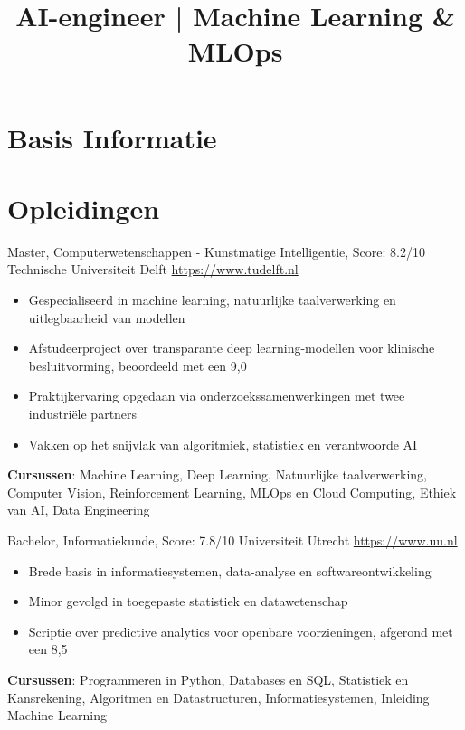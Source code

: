 \documentclass[a4paper, serif, 10pt]{moderncv}
\title{AI-engineer | Machine Learning \& MLOps}
\begin{document}
\maketitle

\section{Basis Informatie}

\section{Opleidingen}

        {Master, Computerwetenschappen - Kunstmatige Intelligentie, Score: 8.2/10}
        {Technische Universiteit Delft}
        {\url{https://www.tudelft.nl}}
        {}
        {\begin{itemize}
\item Gespecialiseerd in machine learning, natuurlijke taalverwerking en uitlegbaarheid van modellen
\item Afstudeerproject over transparante deep learning-modellen voor klinische besluitvorming, beoordeeld met een 9,0
\item Praktijkervaring opgedaan via onderzoekssamenwerkingen met twee industriële partners
\item Vakken op het snijvlak van algoritmiek, statistiek en verantwoorde AI
\end{itemize}
\textbf{Cursussen}: Machine Learning, Deep Learning, Natuurlijke taalverwerking, Computer Vision, Reinforcement Learning, MLOps en Cloud Computing, Ethiek van AI, Data Engineering}

        {Bachelor, Informatiekunde, Score: 7.8/10}
        {Universiteit Utrecht}
        {\url{https://www.uu.nl}}
        {}
        {\begin{itemize}
\item Brede basis in informatiesystemen, data-analyse en softwareontwikkeling
\item Minor gevolgd in toegepaste statistiek en datawetenschap
\item Scriptie over predictive analytics voor openbare voorzieningen, afgerond met een 8,5
\end{itemize}
\textbf{Cursussen}: Programmeren in Python, Databases en SQL, Statistiek en Kansrekening, Algoritmen en Datastructuren, Informatiesystemen, Inleiding Machine Learning}
\end{document}
